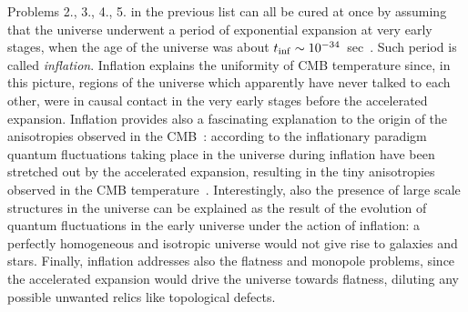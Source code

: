 \documentclass[12pt,a4paper]{book}
\begin{document}
Problems 2., 3., 4., 5. in the previous list can all be cured at once by assuming that the universe underwent a period of exponential expansion at very early stages, when the age of the universe was about $t_{\rm inf} \sim 10^{-34} \,$ sec~\cite{Guth:1980zm, Linde:1981mu, Albrecht:1982wi}. Such period is called \textit{inflation}. Inflation explains the uniformity of CMB temperature since, in this picture, regions of the universe which apparently have never talked to each other, were in causal contact in the very early stages before the accelerated expansion. Inflation provides also a fascinating explanation to the origin of the anisotropies observed in the CMB~\cite{Mukhanov:1990me, Gorbunov:2011zzc}: according to the inflationary paradigm quantum fluctuations taking place in the universe during inflation have been stretched out by the accelerated expansion, resulting in the tiny anisotropies observed in the CMB temperature~\cite{Ade:2015xua, Ade:2015lrj}. Interestingly, also the presence of large scale structures in the universe can be explained as the result of the evolution of quantum fluctuations in the early universe under the action of inflation: a perfectly homogeneous and isotropic universe would not give rise to galaxies and stars. Finally, inflation addresses also the flatness and monopole problems, since the accelerated expansion would drive the universe towards flatness, diluting any possible unwanted relics like topological defects.\\
\end{document}
